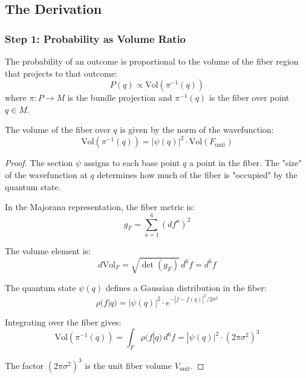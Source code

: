 \subsection{The Derivation}

\subsubsection{Step 1: Probability as Volume Ratio}

\begin{axiom}
The probability of an outcome is proportional to the volume of the fiber region that projects to that outcome:
\begin{equation}
    P(q) \propto \text{Vol}\left(\pi^{-1}(q)\right)
\end{equation}
where $\pi: P \to M$ is the bundle projection and $\pi^{-1}(q)$ is the fiber over point $q \in M$.
\end{axiom}

\begin{lemma}
The volume of the fiber over $q$ is given by the norm of the wavefunction:
\begin{equation}
    \text{Vol}\left(\pi^{-1}(q)\right) = |\psi(q)|^2 \cdot \text{Vol}(F_{\text{unit}})
\end{equation}
\end{lemma}

\begin{proof}
The section $\psi$ assigns to each base point $q$ a point in the fiber. The "size" of the wavefunction at $q$ determines how much of the fiber is "occupied" by the quantum state.

In the Majorana representation, the fiber metric is:
\begin{equation}
    g_F = \sum_{a=1}^6 (df^a)^2
\end{equation}

The volume element is:
\begin{equation}
    d\text{Vol}_F = \sqrt{\det(g_F)} \, d^6f = d^6f
\end{equation}

The quantum state $\psi(q)$ defines a Gaussian distribution in the fiber:
\begin{equation}
    \rho(f|q) = |\psi(q)|^2 \cdot e^{-|f - \bar{f}(q)|^2/2\sigma^2}
\end{equation}

Integrating over the fiber gives:
\begin{equation}
    \text{Vol}\left(\pi^{-1}(q)\right) = \int_F \rho(f|q) \, d^6f = |\psi(q)|^2 \cdot (2\pi\sigma^2)^3
\end{equation}

The factor $(2\pi\sigma^2)^3$ is the unit fiber volume $V_{\text{unit}}$.
\end{proof}

